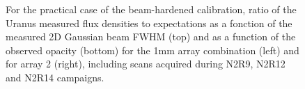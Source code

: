 \begin{figure}[ht!]
\begin{center}
\caption[Uranus flux density stability using the
  practical case of the beam-hardened calibration]{For the
  practical case of the beam-hardened calibration, 
  ratio of the Uranus measured flux densities to expectations as a
  fonction of the measured 2D Gaussian beam FWHM (top) and as a
  function of the observed opacity (bottom) for the 1mm array
  combination (left) and for array 2 (right),
  including scans acquired during N2R9, N2R12 and N2R14 campaigns. }
\label{fig:photocorr_pointing_uranus_flux_fwhm}
\end{center}
\end{figure}

